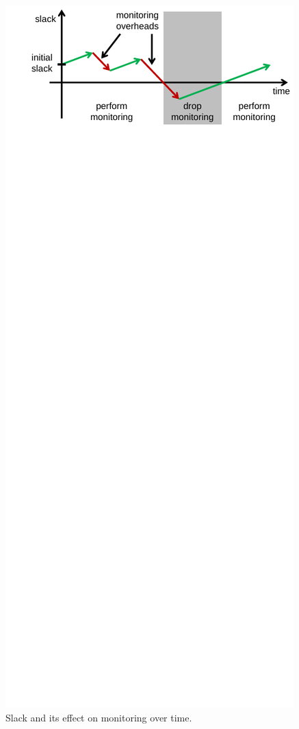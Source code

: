\begin{figure}
  \begin{center}
    \includegraphics[width=\columnwidth]{figs/slack.pdf}
    \vspace{-0.2in}
    \caption{Slack and its effect on monitoring over time.}
    \label{fig:policies.slack}
    \vspace{-0.1in}
  \end{center}
\end{figure}

